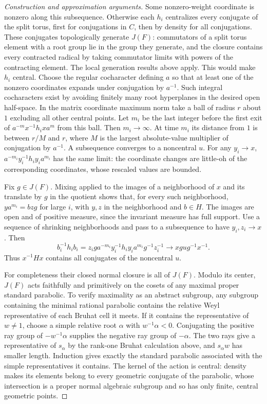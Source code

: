 \documentclass[11pt,a4paper,openany,oneside]{book}
\theoremstyle{resultstyle}
\theoremstyle{definition}
\numberwithin{equation}{chapter}
\begin{document}
\begin{proof}[Construction and approximation arguments]
Some nonzero-weight coordinate is nonzero along this
subsequence. Otherwise each \(h_i\) centralizes every
conjugate of the split torus, first for conjugations
in \(C\), then by density for all conjugations. These
conjugates topologically generate \(J(F)\): commutators
of a split torus element with a root group lie in the
group they generate, and the closure contains every
contracted radical by taking commutator limits with
powers of the contracting element. The local
generation results above apply. This would
make \(h_i\) central. Choose the regular cocharacter
defining \(a\) so that at least one of the nonzero
coordinates expands under conjugation by \(a^{-1}\).
Such integral cocharacters exist by avoiding finitely
many root hyperplanes in the desired open half-space.
In the matrix coordinate maximum norm take a ball of
radius \(r\) about \(1\) excluding all other central
points. Let \(m_i\) be the last integer before the
first exit of \(a^{-m}x^{-1}h_i x a^m\) from this ball.
Then \(m_i\to\infty\). At time \(m_i\) its distance
from \(1\) is between \(r/M\) and \(r\), where \(M\)
is the largest absolute-value multiplier of conjugation
by \(a^{-1}\). A subsequence converges to a noncentral
\(u\). For any \(y_i\to x\),
\(a^{-m_i}y_i^{-1}h_i y_i a^{m_i}\) has the same limit:
the coordinate changes are little-oh of the corresponding
coordinates, whose rescaled values are bounded.

Fix \(g\in J(F)\). Mixing applied to the images of a
neighborhood of \(x\) and its translate by \(g\) in
the quotient shows that, for every such neighborhood,
\(y a^{m_i}=b z g\) for large \(i\), with \(y,z\)
in the neighborhood and \(b\in H\). The images are
open and of positive measure, since the invariant
measure has full support. Use a sequence of shrinking
neighborhoods and pass to a subsequence to have
\(y_i,z_i\to x\). Then
\[
 b_i^{-1}h_i b_i
   = z_i g a^{-m_i}y_i^{-1}h_i y_i a^{m_i}g^{-1}z_i^{-1}
   \longrightarrow xgug^{-1}x^{-1}.
\]
Thus \(x^{-1}Hx\) contains all conjugates of the noncentral \(u\).

For completeness their closed normal closure is all of \(J(F)\).
Modulo its center, \(J(F)\) acts faithfully and primitively
on the cosets of any maximal proper standard parabolic.
To verify maximality as an abstract subgroup, any subgroup
containing the minimal rational parabolic contains the
relative Weyl representative of each Bruhat cell it meets.
If it contains the representative of \(w\ne1\), choose a
simple relative root \(\alpha\) with \(w^{-1}\alpha<0\).
Conjugating the positive ray group of \(-w^{-1}\alpha\)
supplies the negative ray group of \(-\alpha\).
The two rays give a representative of \(s_\alpha\) by
the rank-one Bruhat calculation above, and \(s_\alpha w\)
has smaller length.
Induction gives exactly the standard parabolic associated
with the simple representatives it contains. The kernel
of the action is central: density makes its elements
belong to every geometric conjugate of the parabolic,
whose intersection is a proper normal algebraic
subgroup and so has only finite, central geometric points.


\end{proof}
\end{document}
